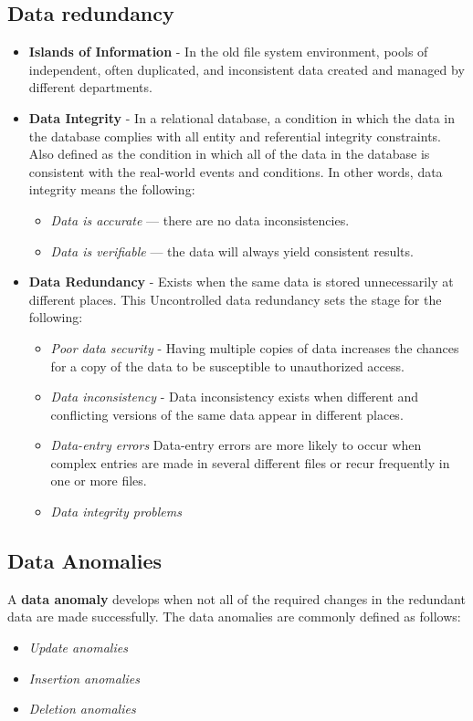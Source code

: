 \documentclass[a4paper, 12pt, titlepage]{report}
\begin{document}
\subsection{Data redundancy}
\begin{itemize}
\item \textbf{Islands of Information} - In the old file system environment, pools of independent, often duplicated, and inconsistent data created and managed by different departments.
\item \textbf{Data Integrity} - In a relational database, a condition in which the data in the database complies with all entity and referential integrity constraints. Also defined as the condition in which all of the data in the database is consistent with the real-world events and conditions. In other words, data integrity means the following:
\begin{itemize}
\item \emph{Data is accurate} — there are no data inconsistencies.
\item \emph{Data is verifiable} — the data will always yield consistent results.
\end{itemize}
\item \textbf{Data Redundancy} - Exists when the same data is stored unnecessarily at different places. This Uncontrolled data redundancy sets the stage for the following:
\begin{itemize}
\item \emph{Poor data security} - Having multiple copies of data increases the chances for a copy of
the data to be susceptible to unauthorized access.
\item \emph{Data inconsistency} - Data inconsistency exists when different and conflicting versions of the same data appear in different places.
\item \emph{Data-entry errors} Data-entry errors are more likely to occur when complex entries are made in several different files or recur frequently in one or more files.
\item \emph{Data integrity problems}
\end{itemize}
\end{itemize}
\subsection{Data Anomalies}
A \textbf{data anomaly} develops when not all of the required changes in the redundant data are made successfully. The data anomalies are commonly defined as follows:
\begin{itemize}
\item \emph{Update anomalies}
\item \emph{Insertion anomalies}
\item \emph{Deletion anomalies}
\end{itemize}
\end{document}
